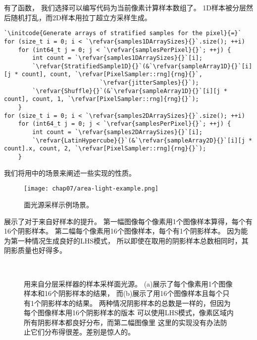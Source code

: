 有了函数，
我们选择可以编写代码为当前像素计算样本数组了。
1D样本被分层然后随机打乱，而2D样本用拉丁超立方采样生成。
\begin{lstlisting}
`\initcode{Generate arrays of stratified samples for the pixel}{=}`
for (size_t i = 0; i < `\refvar{samples1DArraySizes}{}`.size(); ++i)
    for (int64_t j = 0; j < `\refvar{samplesPerPixel}{}`; ++j) {
        int count = `\refvar{samples1DArraySizes}{}`[i];
        `\refvar{StratifiedSample1D}{}`(&`\refvar{sampleArray1D}{}`[i][j * count], count, `\refvar[PixelSampler::rng]{rng}{}`,
                           `\refvar{jitterSamples}{}`);
        `\refvar{Shuffle}{}`(&`\refvar{sampleArray1D}{}`[i][j * count], count, 1, `\refvar[PixelSampler::rng]{rng}{}`);
    }
for (size_t i = 0; i < `\refvar{samples2DArraySizes}{}`.size(); ++i)
    for (int64_t j = 0; j < `\refvar{samplesPerPixel}{}`; ++j) {
        int count = `\refvar{samples2DArraySizes}{}`[i];
        `\refvar{LatinHypercube}{}`(&`\refvar{sampleArray2D}{}`[i][j * count].x, count, 2, `\refvar[PixelSampler::rng]{rng}{}`);
    }
\end{lstlisting}

我们将用中的场景来阐述一些实现的性质。
\begin{figure}[htbp]
    \centering\texttt{[image: chap07/area-light-example.png]}
    \caption{面光源采样示例场景。}
    \label{fig:7.23}
\end{figure}

展示了对于来自好样本的提升。
第一幅图像每个像素用1个图像样本算得，每个有16个阴影样本。
第二幅每个像素用16个图像样本，每个有1个阴影样本。
因为能为第一种情况生成良好的LHS模式，
所以即使在取用的阴影样本总数相同时，其阴影质量也好得多。

\begin{figure}[htbp]
    \centering
    \\
    \caption{用来自分层采样器的样本采样面光源。
        (a)展示了每个像素用1个图像样本和16个阴影样本的结果，
        而(b)展示了用16个图像样本且每个只有1个阴影样本的结果。
        两种情况阴影样本的总数是一样的，但因为每个图像样本用16个阴影样本的版本
        可以使用LHS模式，像素区域内所有阴影样本都良好分布，而第二幅图像里
        这里的实现没有办法防止它们分布得很差。差别是惊人的。}
    \label{fig:7.24}
\end{figure}